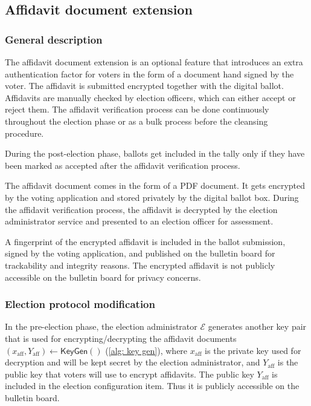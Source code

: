 \subsection{Affidavit document extension} \label{app: affidavit document extension}


\subsubsection{General description}
The affidavit document extension is an optional feature that introduces an extra authentication factor for voters in the form of a document hand signed by the voter. The affidavit is submitted encrypted together with the digital ballot. Affidavits are manually checked by election officers, which can either accept or reject them. The affidavit verification process can be done continuously throughout the election phase or as a bulk process before the cleansing procedure.

During the post-election phase, ballots get included in the tally only if they have been marked as accepted after the affidavit verification process.

The affidavit document comes in the form of a PDF document. It gets encrypted by the voting application and stored privately by the digital ballot box. During the affidavit verification process, the affidavit is decrypted by the election administrator service and presented to an election officer for assessment.

A fingerprint of the encrypted affidavit is included in the ballot submission, signed by the voting application, and published on the bulletin board for trackability and integrity reasons. The encrypted affidavit is not publicly accessible on the bulletin board for privacy concerns. 


\subsubsection{Election protocol modification}
In the pre-election phase, the election administrator $\mathcal{E}$ generates another key pair that is used for encrypting/decrypting the affidavit documents $(x_\mathrm{aff}, Y_\mathrm{aff}) \gets \mathsf{KeyGen}()$ (\cref{alg: key gen}), where $x_\mathrm{aff}$ is the private key used for decryption and will be kept secret by the election administrator, and $Y_\mathrm{aff}$ is the public key that voters will use to encrypt affidavits. The public key $Y_\mathrm{aff}$ is included in the election configuration item. Thus it is publicly accessible on the bulletin board.

